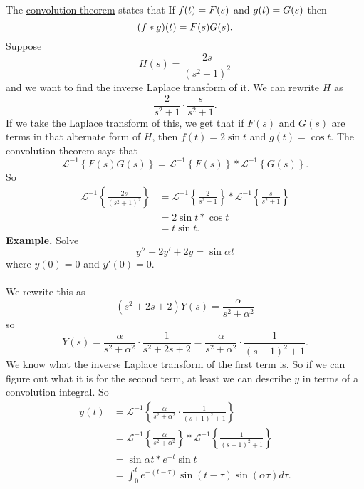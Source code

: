 \documentclass[11pt, oneside]{article}   	%
\let\L\relax
\newcommand{\L}[1]{\mathcal{L}\left\{#1\right\}}
\newcommand{\Li}[1]{\mathcal{L}^{-1}\left\{#1\right\}}
\begin{document}
The \underline{convolution theorem} states that If $\L{f(t)} = F(s)$ and $\L{g(t)} = G(s)$ then
$$
\L{(f*g)(t)} = F(s)G(s).
$$
Suppose 
$$
H(s) = \frac{2s}{(s^2+1)^2}
$$ 
and we want to find the inverse Laplace transform of it. We can rewrite $H$ as
$$
\frac{2}{s^2+1}\cdot\frac{s}{s^2+1}.
$$
If we take the Laplace transform of this, we get that if $F(s)$ and $G(s)$ are terms in that alternate form of $H$, then $f(t) = 2\sin t$ and $g(t) =\cos t$. The convolution theorem says that
$$
\Li{F(s)G(s)} = \Li{F(s)} * \Li{G(s)}.
$$
So 
\begin{align*}
\Li{\frac{2s}{(s^2+1)^2}} 	&= \Li{\frac{2}{s^2+1}} * \Li{\frac{s}{s^2+1}}\\
					&= 2\sin t * \cos t\\
					&= t\sin t.
\end{align*}
\textbf{Example.} Solve
$$
y'' + 2y' + 2y = \sin\alpha t
$$
where $y(0)=0$ and $y'(0)=0$.\\\\
We rewrite this as 
$$
(s^2 + 2s + 2)Y(s)= \frac{\alpha}{s^2+\alpha^2}
$$
so
$$
Y(s) = \frac{\alpha}{s^2 + \alpha ^2} \cdot \frac{1}{s^2 + 2s+2} = \frac{\alpha}{s^2 + \alpha ^2} \cdot \frac{1}{(s+1)^2+1}.
$$
We know what the inverse Laplace transform of the first term is. So if we can figure out what it is for the second term, at least we can describe $y$ in terms of a convolution integral. So 
\begin{align*}
y(t) 	&= \Li{\frac{\alpha}{s^2 + \alpha ^2} \cdot \frac{1}{(s+1)^2+1}}\\
	&=  \Li{\frac{\alpha}{s^2 + \alpha ^2}} * \Li{\frac{1}{(s+1)^2+1}}\\
	&= \sin \alpha t * e^{-t}\sin t\\
	&= \int_0^t e^{-(t-\tau)}\sin(t-\tau)\sin(\alpha\tau)d\tau.
\end{align*}
\end{document}
